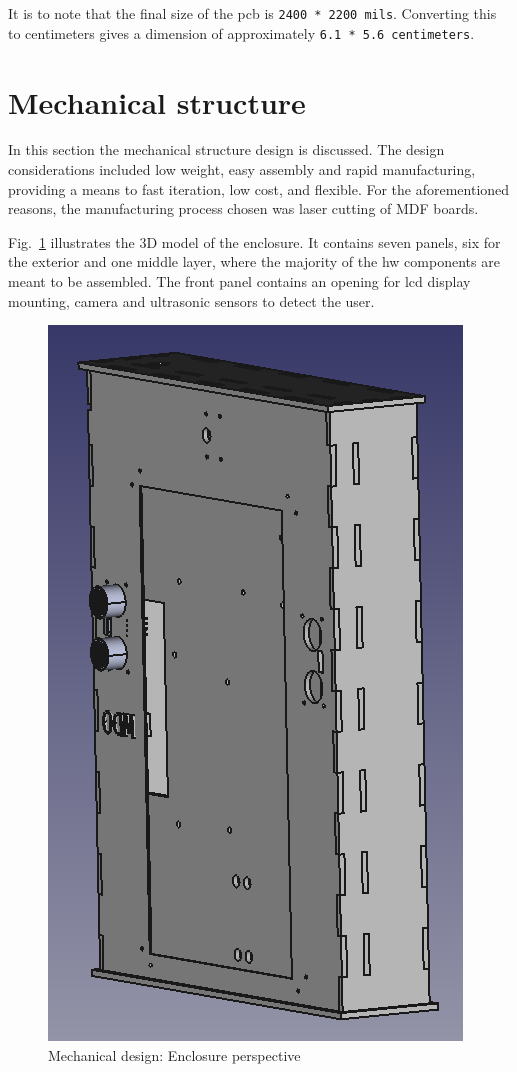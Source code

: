 It is to note that the final size of the \gls{pcb} is \texttt{2400 * 2200 mils}. Converting this to centimeters gives a dimension of approximately \texttt{6.1 * 5.6 centimeters}.
%  

\section{Mechanical structure}
\label{sec:mechanical-structure}
In this section the mechanical structure design is
discussed.
The design considerations included low weight, easy assembly and
rapid manufacturing, providing a means to fast iteration, low cost, and
flexible. For the aforementioned reasons, the manufacturing process chosen was
laser cutting of MDF boards.

Fig.~\ref{fig:mech-design-perspective} illustrates the 3D model of
the enclosure. It contains seven panels, six for the exterior and one middle
layer, where the majority of the \gls{hw} components are meant to be
assembled. The front panel contains an opening for \gls{lcd} display mounting,
camera and ultrasonic sensors to detect the user.
% 
\begin{figure}[htb!]
\centering
    \includegraphics[width=0.6\columnwidth]{./img/mech-design-perspective.png}
  \caption{Mechanical design: Enclosure perspective}%
\label{fig:mech-design-perspective}
\end{figure}

